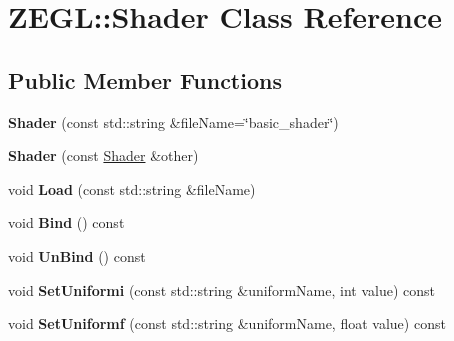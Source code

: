 \hypertarget{class_z_e_g_l_1_1_shader}{}\section{Z\+E\+G\+L\+:\+:Shader Class Reference}
\label{class_z_e_g_l_1_1_shader}
\subsection*{Public Member Functions}
\begin{DoxyCompactItemize}
\item 
\hypertarget{class_z_e_g_l_1_1_shader_af8077122b1822f29e9fb7e199305fa52}{}{\bfseries Shader} (const std\+::string \&file\+Name=\char`\"{}basic\+\_\+shader\char`\"{})\label{class_z_e_g_l_1_1_shader_af8077122b1822f29e9fb7e199305fa52}

\item 
\hypertarget{class_z_e_g_l_1_1_shader_adab8e450ec1f4509c1bdf147e47a871c}{}{\bfseries Shader} (const \hyperlink{class_z_e_g_l_1_1_shader}{Shader} \&other)\label{class_z_e_g_l_1_1_shader_adab8e450ec1f4509c1bdf147e47a871c}

\item 
\hypertarget{class_z_e_g_l_1_1_shader_a622af0755141fc6286d3f0a50c294239}{}void {\bfseries Load} (const std\+::string \&file\+Name)\label{class_z_e_g_l_1_1_shader_a622af0755141fc6286d3f0a50c294239}

\item 
\hypertarget{class_z_e_g_l_1_1_shader_a80b52feb71b870447cd0f2a20ca68400}{}void {\bfseries Bind} () const \label{class_z_e_g_l_1_1_shader_a80b52feb71b870447cd0f2a20ca68400}

\item 
\hypertarget{class_z_e_g_l_1_1_shader_a437266d05c0aa8d125ec92e50dfe4d66}{}void {\bfseries Un\+Bind} () const \label{class_z_e_g_l_1_1_shader_a437266d05c0aa8d125ec92e50dfe4d66}

\item 
\hypertarget{class_z_e_g_l_1_1_shader_a1215713a36b12d48c1c94b56c889c269}{}void {\bfseries Set\+Uniformi} (const std\+::string \&uniform\+Name, int value) const \label{class_z_e_g_l_1_1_shader_a1215713a36b12d48c1c94b56c889c269}

\item 
\hypertarget{class_z_e_g_l_1_1_shader_aad923978e650300bfe1f82e6ec132fc3}{}void {\bfseries Set\+Uniformf} (const std\+::string \&uniform\+Name, float value) const \label{class_z_e_g_l_1_1_shader_aad923978e650300bfe1f82e6ec132fc3}


\end{DoxyCompactItemize}
